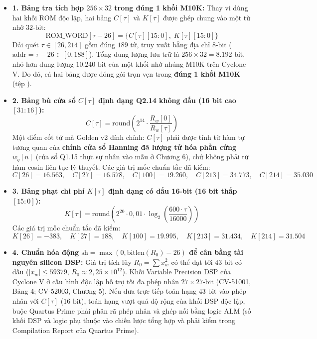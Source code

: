 \begin{itemize}[leftmargin=1.5em, itemsep=2pt]
    \item \textbf{1. Bảng tra tích hợp $256 \times 32$ trong đúng 1 khối M10K:}
    Thay vì dùng hai khối ROM độc lập, hai bảng $C[\tau]$ và $K[\tau]$ được ghép chung vào một từ nhớ $32\text{-bit}$:
    \begin{equation}
    \text{ROM\_WORD}[\tau - 26] = \{ C[\tau][15:0],\; K[\tau][15:0] \}
    \end{equation}
    Dải quét $\tau \in [26, 214]$ gồm đúng $189\text{ từ}$, truy xuất bằng địa chỉ $8\text{-bit}$ ($\text{addr} = \tau - 26 \in [0, 188]$). Tổng dung lượng lưu trữ là $256 \times 32 = 8.192\text{ bit}$, nhỏ hơn dung lượng $10.240\text{ bit}$ của một khối nhớ nhúng M10K trên Cyclone V. Do đó, cả hai bảng được đóng gói trọn vẹn trong \textbf{đúng 1 khối M10K} (tệp ).
    
    \item \textbf{2. Bảng bù cửa sổ $C[\tau]$ định dạng Q2.14 không dấu (16 bit cao $[31:16]$):}
    \begin{equation}
    C[\tau] = \text{round}\left( 2^{14} \cdot \frac{R_w[0]}{R_w[\tau]} \right)
    \end{equation}
    Một điểm cốt tử mà Golden v2 đính chính: $C[\tau]$ phải được tính từ hàm tự tương quan của \textbf{chính cửa sổ Hanning đã lượng tử hóa phần cứng $w_q[n]$} (cửa sổ Q1.15 thực sự nhân vào mẫu ở Chương 6), chứ không phải từ hàm cosin liên tục lý thuyết.
    Các giá trị mốc chuẩn tắc đã kiểm:
    \begin{equation}
    C[26] = 16.563, \quad C[27] = 16.578, \quad C[100] = 19.260, \quad C[213] = 34.773, \quad C[214] = 35.030
    \end{equation}

    \item \textbf{3. Bảng phạt chi phí $K[\tau]$ định dạng có dấu 16-bit (16 bit thấp $[15:0]$):}
    \begin{equation}
    K[\tau] = \text{round}\left( 2^{20} \cdot 0{,}01 \cdot \log_2\left(\frac{600 \cdot \tau}{16000}\right) \right)
    \end{equation}
    Các giá trị mốc chuẩn tắc đã kiểm:
    \begin{equation}
    K[26] = -383, \quad K[27] = 188, \quad K[100] = 19.995, \quad K[213] = 31.434, \quad K[214] = 31.504
    \end{equation}

    \item \textbf{4. Chuẩn hóa động $\text{sh} = \max(0, \text{bitlen}(R_0) - 26)$ để cân bằng tài nguyên silicon DSP:}
    Giá trị tích lũy $R_0 = \sum x_w^2$ có thể đạt tới $43\text{ bit}$ có dấu ($|x_w| \le 59379$, $R_0 \approx 2{,}25 \times 10^{12}$). Khối Variable Precision DSP của Cyclone V ở cấu hình độc lập hỗ trợ tối đa phép nhân $27 \times 27\text{-bit}$ (CV-51001, Bảng 4; CV-52003, Chương 5). Nếu đưa trực tiếp toán hạng $43\text{ bit}$ vào phép nhân với $C[\tau]$ ($16\text{ bit}$), toán hạng vượt quá độ rộng của khối DSP độc lập, buộc Quartus Prime phải phân rã phép nhân và ghép nối bằng logic ALM (số khối DSP và logic phụ thuộc vào chiến lược tổng hợp và phải kiểm trong Compilation Report của Quartus Prime).
    

\end{itemize}
